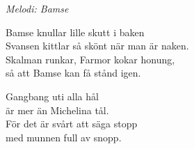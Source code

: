 {\footnotesize\textit{Melodi: Bamse}}\par
\vspace{10pt}
Bamse knullar lille skutt i baken\\
Svansen kittlar så skönt när man är naken.\\
Skalman runkar, Farmor kokar honung,\\
så att Bamse kan få stånd igen.\par
\vspace{10pt}
Gangbang uti alla hål\\
är mer än Michelina tål.\\
För det är svårt att säga stopp\\
med munnen full av snopp.
